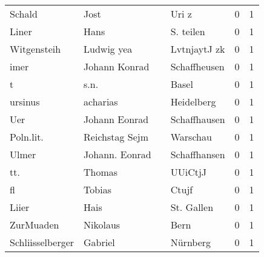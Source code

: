 \begin{tabular}{llllrr}
                   Schald &                               Jost &             &                                       Uri z &          0 &         1 \\
                    Liner &                               Hans &             &                                   S. teilen &          0 &         1 \\
              Witgensteih &                         Ludwig yea &             &                                LvtnjaytJ zk &          0 &         1 \\
                     imer &                      Johann Konrad &             &                                Schaffheusen &          0 &         1 \\
                        t &                               s.n. &             &                                       Basel &          0 &         1 \\
                  ursinus &                           acharias &             &                                  Heidelberg &          0 &         1 \\
                      Uer &                      Johann Eonrad &             &                                Schaffhausen &          0 &         1 \\
                Poln.lit. &                     Reichstag Sejm &             &                                    Warschau &          0 &         1 \\
                    Ulmer &                     Johann. Eonrad &             &                                Schaffhansen &          0 &         1 \\
                      tt. &                             Thomas &             &                                     UUiCtjJ &          0 &         1 \\
                       fl &                             Tobias &             &                                       Ctujf &          0 &         1 \\
                    Liier &                               Hais &             &                                  St. Gallen &          0 &         1 \\
                ZurMuaden &                           Nikolaus &             &                                        Bern &          0 &         1 \\
         Schliisselberger &                            Gabriel &             &                                    Nürnberg &          0 &         1 \\

\end{tabular}
